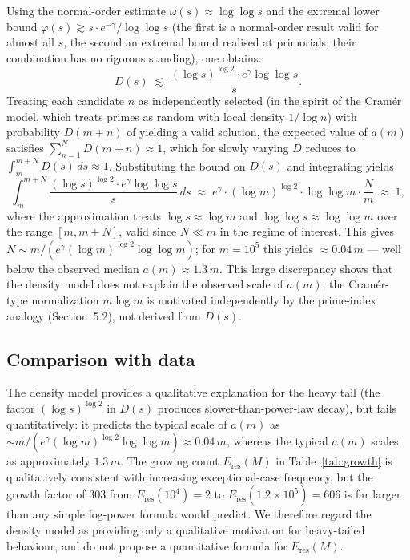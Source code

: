 \documentclass{amsart}
\theoremstyle{definition}
\theoremstyle{remark}
\numberwithin{equation}{section}
\begin{document}
Using the normal-order estimate $\omega(s) \approx \log\log s$
\cite{HardyRamanujan} and the extremal lower bound
$\varphi(s) \gtrsim s \cdot e^{-\gamma}/\log\log s$
\cite{Mertens}
(the first is a normal-order result valid for almost all $s$, the
second an extremal bound realised at primorials; their combination
has no rigorous standing), one obtains:
\[
D(s) \;\lesssim\;
\frac{(\log s)^{\log 2} \cdot e^{\gamma} \log\log s}{s}.
\]
Treating each candidate $n$ as independently selected
(in the spirit of the Cram\'er model, which treats primes as random
with local density $1/\log n$)
with probability $D(m+n)$ of yielding a valid solution,
the expected value of $a(m)$
satisfies $\sum_{n=1}^{N} D(m+n) \approx 1$, which for slowly varying
$D$ reduces to $\int_m^{m+N} D(s)\,ds \approx 1$.
Substituting the bound on $D(s)$ and integrating yields
\[
\int_m^{m+N} \frac{(\log s)^{\log 2} \cdot e^{\gamma} \log\log s}{s}
\,ds
\;\approx\;
e^{\gamma} \cdot (\log m)^{\log 2} \cdot \log\log m
\cdot \frac{N}{m}
\;\approx\; 1,
\]
where the approximation treats $\log s \approx \log m$ and
$\log\log s \approx \log\log m$ over the range $[m, m+N]$, valid
since $N \ll m$ in the regime of interest.
This gives $N \sim m/(e^{\gamma} (\log m)^{\log 2} \log\log m)$;
for $m = 10^5$ this yields
$\approx 0.04\,m$ --- well below the observed median
$a(m) \approx 1.3\,m$.
This large discrepancy shows that the density model does not explain
the observed scale of $a(m)$; the Cram\'er-type normalization
$m\log m$ is motivated independently by the prime-index analogy
(Section~5.2), not derived from $D(s)$.

\subsection{Comparison with data}

The density model provides a qualitative explanation for the heavy tail
(the factor $(\log s)^{\log 2}$ in $D(s)$ produces slower-than-power-law
decay), but fails quantitatively: it predicts the typical scale of
$a(m)$ as $\sim m/(e^{\gamma} (\log m)^{\log 2} \log\log m)
\approx 0.04\,m$, whereas the typical $a(m)$ scales as
approximately $1.3\,m$.
The growing count $E_{\mathrm{res}}(M)$ in Table~\ref{tab:growth} is
qualitatively consistent with increasing exceptional-case frequency,
but the growth factor of $303$ from $E_{\mathrm{res}}(10^4) = 2$ to
$E_{\mathrm{res}}(1.2 \times 10^5) = 606$ is far larger than any simple
log-power formula would predict.
We therefore regard the density model as providing only a qualitative
motivation for heavy-tailed behaviour, and do not propose a
quantitative formula for $E_{\mathrm{res}}(M)$.
\end{document}
